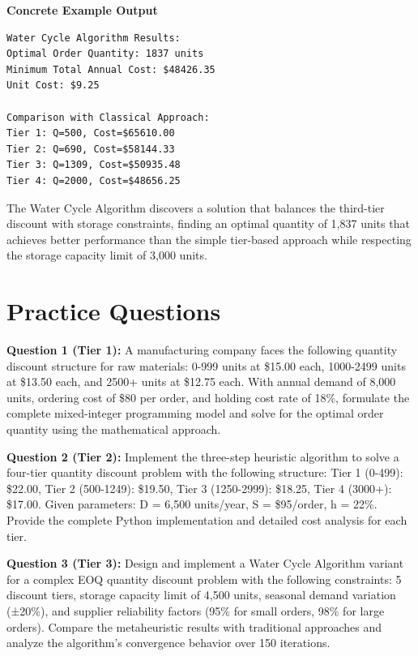 \documentclass{article}
\begin{document}
\textbf{Concrete Example Output}

\begin{verbatim}
Water Cycle Algorithm Results:
Optimal Order Quantity: 1837 units
Minimum Total Annual Cost: $48426.35
Unit Cost: $9.25

Comparison with Classical Approach:
Tier 1: Q=500, Cost=$65610.00
Tier 2: Q=690, Cost=$58144.33
Tier 3: Q=1309, Cost=$50935.48
Tier 4: Q=2000, Cost=$48656.25
\end{verbatim}

The Water Cycle Algorithm discovers a solution that balances the third-tier discount with storage constraints, finding an optimal quantity of 1,837 units that achieves better performance than the simple tier-based approach while respecting the storage capacity limit of 3,000 units.

\section{Practice Questions}

\textbf{Question 1 (Tier 1):} A manufacturing company faces the following quantity discount structure for raw materials: 0-999 units at \$15.00 each, 1000-2499 units at \$13.50 each, and 2500+ units at \$12.75 each. With annual demand of 8,000 units, ordering cost of \$80 per order, and holding cost rate of 18\%, formulate the complete mixed-integer programming model and solve for the optimal order quantity using the mathematical approach.

\textbf{Question 2 (Tier 2):} Implement the three-step heuristic algorithm to solve a four-tier quantity discount problem with the following structure: Tier 1 (0-499): \$22.00, Tier 2 (500-1249): \$19.50, Tier 3 (1250-2999): \$18.25, Tier 4 (3000+): \$17.00. Given parameters: D = 6,500 units/year, S = \$95/order, h = 22\%. Provide the complete Python implementation and detailed cost analysis for each tier.

\textbf{Question 3 (Tier 3):} Design and implement a Water Cycle Algorithm variant for a complex EOQ quantity discount problem with the following constraints: 5 discount tiers, storage capacity limit of 4,500 units, seasonal demand variation (±20\%), and supplier reliability factors (95\% for small orders, 98\% for large orders). Compare the metaheuristic results with traditional approaches and analyze the algorithm's convergence behavior over 150 iterations.
\end{document}
